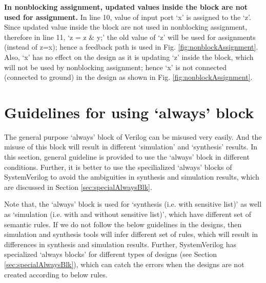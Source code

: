 \begin{explanation}
	\textbf{	In nonblocking assignment, updated values inside the block are not used for assignment.} In line 10, value of input port `x' is assigned to the `z'. Since updated value inside the block are not used in nonblocking assignment, therefore in line 11, `z = z $\&$ y;' the old value of `z' will be used for assignments (instead of z=x); hence a feedback path is used in Fig. \ref{fig:nonblockAssignment}. Also, `x' has no effect on the design as it is updating `z' inside the block, which will not be used by nonblocking assignment; hence `x' is not connected (connected to ground) in the design as shown in Fig. \ref{fig:nonblockAssignment}.
\end{explanation}



\section{Guidelines for using `always' block}
The general purpose `always' block of Verilog can be misused very easily. And the misuse of this block will result in different `simulation' and `synthesis' results. In this section, general guideline is provided to use the `always' block in different conditions. Further, it is better to use the specilialized `always' blocks of SystemVerilog to avoid the ambiguities in synthesis and simulation results, which are discussed in Section \ref{sec:specialAlwaysBlk}. 

\begin{noNumBox}
	Note that, the `always' block is used for `synthesis (i.e. with sensitive list)' as well as `simulation (i.e. with and without sensitive list)', which have different set of semantic rules. If we do not follow the below guidelines in the designs, then simulation and synthesis tools will infer different set of rules, which will result in differences in synthesis and simulation results. Further, SystemVerilog has specialized `always blocks' for different types of designs (see Section \ref{sec:specialAlwaysBlk}), which can catch the errors when the designs are not created according to below rules. 
\end{noNumBox}
